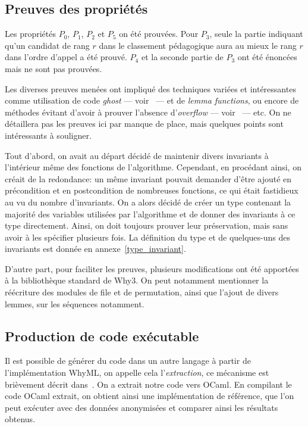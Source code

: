   \subsection{Preuves des propriétés}

    Les propriétés $P_0$, $P_1$, $P_2$ et $P_5$ on été prouvées. Pour $P_3$, seule la partie indiquant qu'un candidat de rang $r$ dans le classement pédagogique aura au mieux le rang $r$ dans l'ordre d'appel a été prouvé. $P_4$ et la seconde partie de $P_3$ ont été énoncées mais ne sont pas prouvées.

    Les diverses preuves menées ont impliqué des techniques variées et intéressantes comme utilisation de code \emph{ghost} --- voir~\cite{Gondelman16_2} --- et de \emph{lemma functions}, ou encore de méthodes évitant d'avoir à prouver l'absence d'\emph{overflow} --- voir~\cite{Clochard15} --- etc. On ne détaillera pas les preuves ici par manque de place, mais quelques points sont intéressants à souligner.

    Tout d'abord, on avait au départ décidé de maintenir divers invariants à l'intérieur même des fonctions de l'algorithme. Cependant, en procédant ainsi, on créait de la redondance: un même invariant pouvait demander d'être ajouté en précondition et en postcondition de nombreuses fonctions, ce qui était fastidieux au vu du nombre d'invariants. On a alors décidé de créer un type contenant la majorité des variables utilisées par l'algorithme et de donner des invariants à ce type directement. Ainsi, on doit toujours prouver leur préservation, mais sans avoir à les spécifier plusieurs fois. La définition du type et de quelques-uns des invariants est donnée en annexe~\ref{type_invariant}.

    D'autre part, pour faciliter les preuves, plusieurs modifications ont été apportées à la bibliothèque standard de Why3. On peut notamment mentionner la réécriture des modules de file et de permutation, ainsi que l'ajout de divers lemmes, sur les séquences notamment.

  \subsection{Production de code exécutable}
    Il est possible de générer du code dans un autre langage à partir de l'implémentation WhyML, on appelle cela l'\emph{extraction}, ce mécanisme est brièvement décrit dans~\cite{Filliatre18}. On a extrait notre code vers OCaml. En compilant le code OCaml extrait, on obtient ainsi une implémentation de référence, que l'on peut exécuter avec des données anonymisées et comparer ainsi les résultats obtenus.
